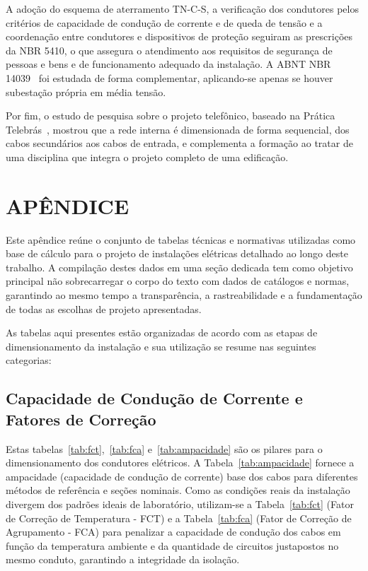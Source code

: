 \documentclass[12pt,openright,oneside,a4paper,brazil]{abntex2}
\begin{document}
A adoção do esquema de aterramento TN-C-S, a verificação dos condutores pelos critérios de capacidade de condução de corrente e de queda de tensão e a coordenação entre condutores e dispositivos de proteção seguiram as prescrições da NBR 5410, o que assegura o atendimento aos requisitos de segurança de pessoas e bens e de funcionamento adequado da instalação. A ABNT NBR 14039~\cite{nbr14039} foi estudada de forma complementar, aplicando-se apenas se houver subestação própria em média tensão.

Por fim, o estudo de pesquisa sobre o projeto telefônico, baseado na Prática Telebrás~\cite{telebras}, mostrou que a rede interna é dimensionada de forma sequencial, dos cabos secundários aos cabos de entrada, e complementa a formação ao tratar de uma disciplina que integra o projeto completo de uma edificação.

\newpage

\chapter{APÊNDICE}

\hspace{1.27cm}Este apêndice reúne o conjunto de tabelas técnicas e normativas utilizadas como base de cálculo para o projeto de instalações elétricas detalhado ao longo deste trabalho. A compilação destes dados em uma seção dedicada tem como objetivo principal não sobrecarregar o corpo do texto com dados de catálogos e normas, garantindo ao mesmo tempo a transparência, a rastreabilidade e a fundamentação de todas as escolhas de projeto apresentadas.

As tabelas aqui presentes estão organizadas de acordo com as etapas de dimensionamento da instalação e sua utilização se resume nas seguintes categorias:

\section{Capacidade de Condução de Corrente e Fatores de Correção}

\hspace{1.27cm}Estas tabelas~\ref{tab:fct},~\ref{tab:fca} e~\ref{tab:ampacidade} são os pilares para o dimensionamento dos condutores elétricos. A Tabela~\ref{tab:ampacidade} fornece a ampacidade (capacidade de condução de corrente) base dos cabos para diferentes métodos de referência e seções nominais. Como as condições reais da instalação divergem dos padrões ideais de laboratório, utilizam-se a Tabela~\ref{tab:fct} (Fator de Correção de Temperatura - FCT) e a Tabela~\ref{tab:fca} (Fator de Correção de Agrupamento - FCA) para penalizar a capacidade de condução dos cabos em função da temperatura ambiente e da quantidade de circuitos justapostos no mesmo conduto, garantindo a integridade da isolação.
\end{document}
